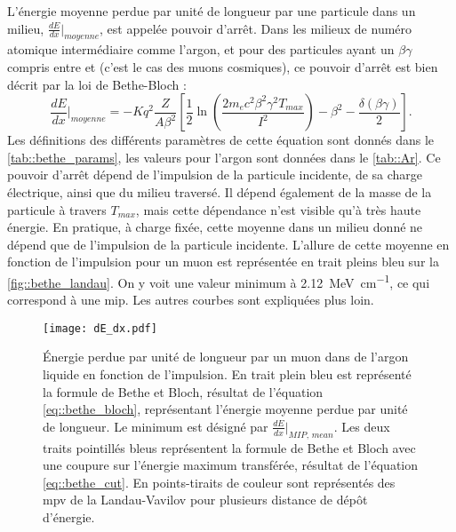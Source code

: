         L'énergie moyenne perdue par unité de longueur par une particule dans un milieu, $\frac{dE}{dx}\rvert_{moyenne}$, est appelée pouvoir d'arrêt. Dans les milieux de numéro atomique intermédiaire comme l'argon, et pour des particules ayant un $\beta\gamma$ compris entre  et  (c'est le cas des muons cosmiques), ce pouvoir d'arrêt est bien décrit par la loi de Bethe-Bloch\cite{pdg2018} :
        \begin{equation}\label{eq::bethe_bloch}
          \frac{dE}{dx}\biggr\rvert_{moyenne} = -Kq^2 \frac{Z}{A\beta^2}\left[\frac{1}{2}\ln\left(\frac{2m_ec^2\beta^2\gamma^2T_{max}}{I^2}\right)-\beta^2-\frac{\delta(\beta\gamma)}{2} \right].
        \end{equation}
        Les définitions des différents paramètres de cette équation sont donnés dans le \autoref{tab::bethe_params}, les valeurs pour l'argon sont données dans le \autoref{tab::Ar}. Ce pouvoir d'arrêt dépend de l'impulsion de la particule incidente, de sa charge électrique, ainsi que du milieu traversé. Il dépend également de la masse de la particule à travers $T_{max}$, mais cette dépendance n'est visible qu'à très haute énergie\cite{pdg2018}. En pratique, à charge fixée, cette moyenne dans un milieu donné ne dépend que de l'impulsion de la particule incidente. L'allure de cette moyenne en fonction de l'impulsion pour un muon est représentée en trait pleins bleu sur la \autoref{fig::bethe_landau}. On y voit une valeur minimum à \SI{2.12}{\mega\electronvolt\per\centi\meter}, ce qui correspond à une \gls{mip}. Les autres courbes sont expliquées plus loin.

        \begin{figure}[htbp]
          \centering
          \texttt{[image: dE\_dx.pdf]}
          \caption[Énergie perdue par unité de longueur par un muon dans de l'argon liquide en fonction de l'impulsion.]{\label{fig::bethe_landau}Énergie perdue par unité de longueur par un muon dans de l'argon liquide en fonction de l'impulsion. En trait plein bleu est représenté la formule de Bethe et Bloch, résultat de l'équation \eqref{eq::bethe_bloch}, représentant l'énergie moyenne perdue par unité de longueur. Le minimum est désigné par $\frac{dE}{dx}\rvert_{MIP,\,mean}$. Les deux traits pointillés bleus représentent la formule de Bethe et Bloch avec une coupure sur l'énergie maximum transférée, résultat de l'équation \eqref{eq::bethe_cut}. En points-tiraits de couleur sont représentés des \gls{mpv} de la Landau-Vavilov pour plusieurs distance de dépôt d'énergie.}
        \end{figure}

